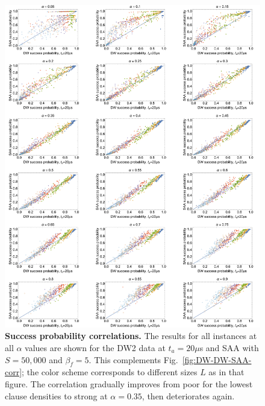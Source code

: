 \begin{figure}
\begin{center}
\includegraphics[width=\textwidth]{chapters/Planted/corrSAAvsDWgrid.pdf}
\caption{\textbf{Success probability correlations.} The results for all instances at all $\alpha$ values are shown for the DW2 data at $t_a=20\mu$s and SAA with $S=50,\!000$ and $\beta_f=5$. This complements Fig.~\ref{fig:DW-DW-SAA-corr}; the color scheme corresponds to different sizes $L$ as in that figure. The correlation gradually improves from poor for the lowest clause densities to strong at $\alpha=0.35$, then deteriorates again.}
\label{fig:corr-SAAvsDW-all-alphas}
\end{center}
\end{figure}


